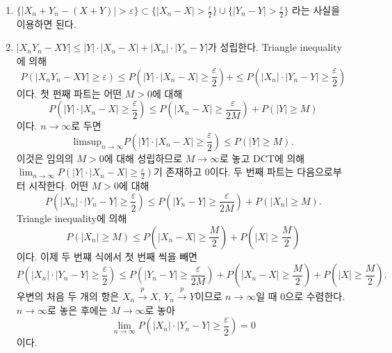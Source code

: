 \documentclass[
  letterpaper,
  DIV=11,
  numbers=noendperiod]{scrreprt}
\theoremstyle{definition}
\theoremstyle{plain}
\theoremstyle{plain}
\theoremstyle{definition}
\theoremstyle{plain}
\theoremstyle{definition}
\theoremstyle{remark}
\begin{document}
\begin{tcolorbox}[enhanced jigsaw, left=2mm, arc=.35mm, leftrule=.75mm, colback=white, title=\textcolor{quarto-callout-note-color}{\faInfo}\hspace{0.5em}{Proof}, rightrule=.15mm, breakable, bottomrule=.15mm, coltitle=black, opacitybacktitle=0.6, opacityback=0, toptitle=1mm, titlerule=0mm, toprule=.15mm, colbacktitle=quarto-callout-note-color!10!white, bottomtitle=1mm, colframe=quarto-callout-note-color-frame]

\begin{enumerate}
\def\labelenumi{\arabic{enumi}.}
\item
  \(\{ |X_n + Y_n - (X+Y) | > \varepsilon\} \subset \{ |X_n - X| > \frac{\varepsilon}{2} \} \cup  \{ |Y_n - Y| > \frac{\varepsilon}{2} \}\)
  라는 사실을 이용하면 된다.
\item
  \(|X_n Y_n - XY | \leq |Y| \cdot |X_n - X| + |X_n | \cdot |Y_n - Y|\)가
  성립한다. Triangle inequality에 의해 \[
  P(|X_n Y_n - XY | \geq \varepsilon) \leq P(|Y| \cdot |X_n - X| \geq \frac{\varepsilon}{2}) + \leq P(|X_n| \cdot |Y_n - Y| \geq \frac{\varepsilon}{2})
  \] 이다. 첫 펀째 파트는 어떤 \(M>0\)에 대해 \[
  P(|Y| \cdot |X_n - X| \geq \frac{\varepsilon}{2})  \leq P(|X_n - X| \geq \frac{\varepsilon}{2M}) + P(|Y| \geq M)
  \] 이다. \(n\rightarrow \infty\)로 두면 \[
  \text{limsup}_{n\rightarrow \infty} P(|Y| \cdot |X_n - X| \geq \frac{\varepsilon}{2}) \leq P(|Y| \geq M).
  \] 이것은 임의의 \(M>0\)에 대해 성립하므로 \(M\rightarrow\infty\)로
  놓고 DCT에 의해
  \(\lim_{n\rightarrow\infty} P(|Y| \cdot |X_n - X| \geq \frac{\varepsilon}{2})\)기
  존재하고 0이다. 두 번째 파트는 다음으로부터 시작한다. 어떤 \(M>0\)에
  대해 \[
  P(|X_n| \cdot |Y_n - Y| \geq \frac{\varepsilon}{2})  \leq P(|Y_n - Y| \geq \frac{\varepsilon}{2M}) + P(|X_n| \geq M).
  \] Triangle inequality에 의해 \[
  P(|X_n| \geq M) \leq P(|X_n - X| \geq \frac{M}{2}) + P(|X| \geq \frac{M}{2})
  \] 이다. 이제 두 번쨰 식에서 첫 번째 씩을 빼면 \[
  P(|X_n | \cdot |Y_n - Y| \geq \frac{\varepsilon}{2}) \leq P(|Y_n - Y|\geq \frac{\varepsilon}{2M}) + P(|X_n - X| \geq \frac{M}{2}) + P(|X| \geq \frac{M}{2}).
  \] 우변의 처음 두 개의 항은 \(X_n \stackrel{p}{\rightarrow} X\),
  \(Y_n \stackrel{p}{\rightarrow} Y\)이므로 \(n\rightarrow\infty\)일 때
  0으로 수렴한다. \(n\rightarrow\infty\)로 놓은 후에는
  \(M\rightarrow\infty\)로 놓아 \[
  \lim_{n\rightarrow \infty} P(|X_n | \cdot |Y_n - Y| \geq \frac{\varepsilon}{2})=0
  \] 이다.
\end{enumerate}

\end{tcolorbox}
\end{document}
